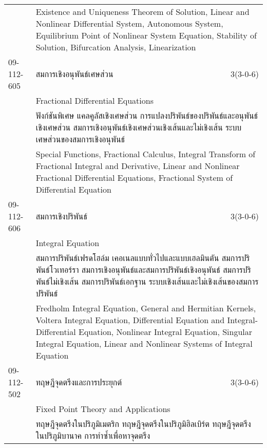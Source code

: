 \begin{longtable}{p{}p{}r{}}
&  \multicolumn{2}{p{0.75\textwidth}}{Existence and Uniqueness Theorem of Solution, Linear and Nonlinear Differential System, Autonomous System, Equilibrium Point of Nonlinear System Equation, Stability of Solution, Bifurcation Analysis, Linearization} \vspace{8mm} \\*
09-112-605 & สมการเชิงอนุพันธ์เศษส่วน & 3(3-0-6)\\*
 & Fractional Differential Equations & \phantom{x} \vspace{3mm} \\*
&  \multicolumn{2}{p{0.75\textwidth}}{ฟังก์ชันพิเศษ แคลคูลัสเชิงเศษส่วน การแปลงปริพันธ์ของปริพันธ์และอนุพันธ์เชิงเศษส่วน สมการเชิงอนุพันธ์เชิงเศษส่วนเชิงเส้นและไม่เชิงเส้น ระบบเศษส่วนของสมการเชิงอนุพันธ์} \vspace{3mm} \\*
&  \multicolumn{2}{p{0.75\textwidth}}{Special Functions, Fractional Calculus, Integral Transform of Fractional Integral and Derivative, Linear and Nonlinear Fractional Differential Equations, Fractional System of Differential Equation} \vspace{8mm} \\*
09-112-606 & สมการเชิงปริพันธ์ & 3(3-0-6)\\*
 & Integral Equation & \phantom{x} \vspace{3mm} \\*
&  \multicolumn{2}{p{0.75\textwidth}}{สมการปริพันธ์เฟรดโฮล์ม เคอเนลแบบทั่วไปและแบบเฮลมินตัน สมการปริพันธ์โวเทอร์รา สมการเชิงอนุพันธ์และสมการปริพันธ์เชิงอนุพันธ์ สมการปริพันธ์ไม่เชิงเส้น สมการปริพันธ์เอกฐาน ระบบเชิงเส้นและไม่เชิงเส้นของสมการปริพันธ์} \vspace{3mm} \\*
&  \multicolumn{2}{p{0.75\textwidth}}{Fredholm Integral Equation, General and Hermitian Kernels, Voltera Integral Equation, Differential Equation and Integral-Differential Equation, Nonlinear Integral Equation, Singular Integral Equation, Linear and Nonlinear Systems of Integral Equation} \vspace{8mm} \\*
09-112-502 & ทฤษฎีจุดตรึงและการประยุกต์ & 3(3-0-6)\\*
 & Fixed Point Theory and Applications & \phantom{x} \vspace{3mm} \\*
&  \multicolumn{2}{p{0.75\textwidth}}{ทฤษฎีจุดตรึงในปริภูมิเมตริก ทฤษฎีจุดตรึงในปริภูมิฮิลเบิร์ต ทฤษฎีจุดตรึงในปริภูมิบานาค การทำซ้ำเพื่อหาจุดตรึง} \vspace{3mm} \\*

\end{longtable}
